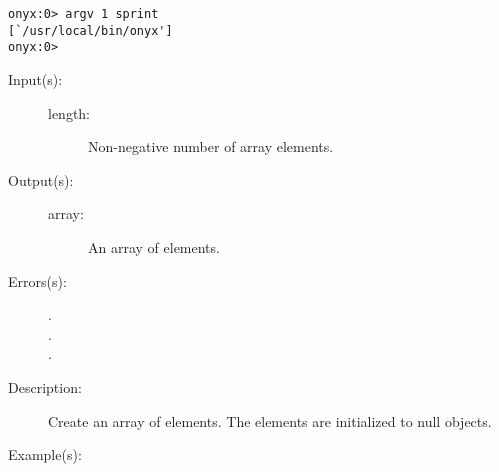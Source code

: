 \begin{description}
\begin{description}
\begin{verbatim}
onyx:0> argv 1 sprint
[`/usr/local/bin/onyx']
onyx:0>
		\end{verbatim}
	\end{description}
\label{systemdict:array}
\item[{\onyxop{length}{array}{array}}: ]
	\begin{description}\item[]
	\item[Input(s): ]
		\begin{description}\item[]
		\item[length: ]
			Non-negative number of array elements.
		\end{description}
	\item[Output(s): ]
		\begin{description}\item[]
		\item[array: ]
			An array of  elements.
		\end{description}
	\item[Errors(s): ]
		\begin{description}\item[]
		\item[.]
		\item[.]
		\item[.]
		\end{description}
	\item[Description: ]
		Create an array of  elements.  The elements are
		initialized to null objects.
	\item[Example(s): ]\begin{verbatim}


\end{verbatim}
\end{description}
\end{description}

